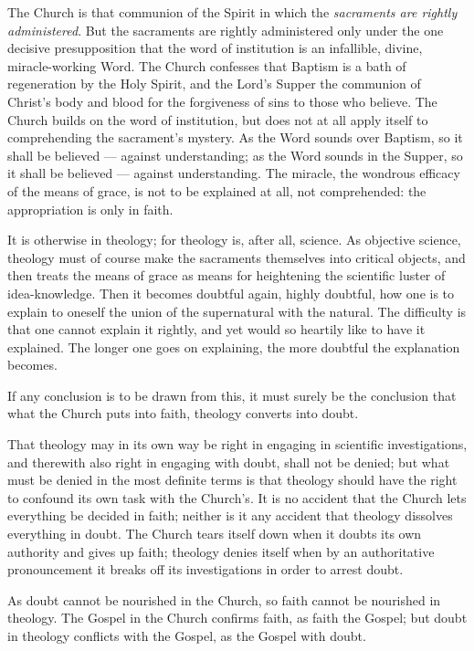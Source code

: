 \documentclass[12pt,a4paper]{book}
\begin{document}
The Church is that communion of the Spirit in which the \emph{sacraments are
rightly administered}. But the sacraments are rightly administered only under
the one decisive presupposition that the word of institution is an infallible,
divine, miracle-working Word. The Church confesses that Baptism is a bath of
regeneration by the Holy Spirit, and the Lord's Supper the communion of
Christ's body and blood for the forgiveness of sins to those who believe. The
Church builds on the word of institution, but does not at all apply itself to
comprehending the sacrament's mystery. As the Word sounds over Baptism, so it
shall be believed --- against understanding; as the Word sounds in the Supper,
so it shall be believed --- against understanding. The miracle, the wondrous
efficacy of the means of grace, is not to be explained at all, not comprehended:
the appropriation is only in faith.

It is otherwise in theology; for theology is, after all, science. As objective
science, theology must of course make the sacraments themselves into critical
objects, and then treats the means of grace as means for heightening the
scientific luster of idea-knowledge. Then it becomes doubtful again, highly
doubtful, how one is to explain to oneself the union of the supernatural with
the natural. The difficulty is that one cannot explain it rightly, and yet
would so heartily like to have it explained. The longer one goes on explaining,
the more doubtful the explanation becomes.

If any conclusion is to be drawn from this, it must surely be the conclusion
that what the Church puts into faith, theology converts into doubt.

That theology may in its own way be right in engaging in scientific
investigations, and therewith also right in engaging with doubt, shall not be
denied; but what must be denied in the most definite terms is that theology
should have the right to confound its own task with the Church's. It is no
accident that the Church lets everything be decided in faith; neither is it any
accident that theology dissolves everything in doubt. The Church tears itself
down when it doubts its own authority and gives up faith; theology denies
itself when by an authoritative pronouncement it breaks off its investigations
in order to arrest doubt.

As doubt cannot be nourished in the Church, so faith cannot be nourished in
theology. The Gospel in the Church confirms faith, as faith the Gospel; but
doubt in theology conflicts with the Gospel, as the Gospel with doubt.
\end{document}

